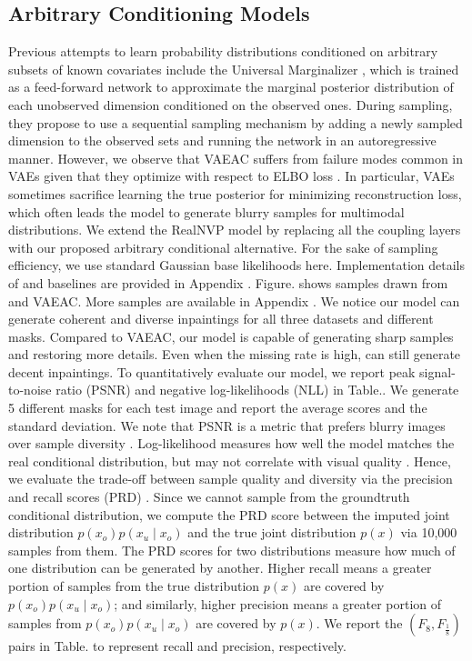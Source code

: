 \documentclass[letterpaper]{article} %
\begin{document}
\subsection{Arbitrary Conditioning Models}
Previous attempts to learn probability distributions conditioned on arbitrary subsets of known covariates include the Universal Marginalizer  , which is trained as a feed-forward network to approximate the marginal posterior distribution of each unobserved dimension conditioned on the observed ones. During sampling, they propose to use a sequential sampling mechanism by adding a newly sampled dimension to the observed sets and running the network in an autoregressive manner.
However, we observe that VAEAC suffers from failure modes common in VAEs given that they optimize with respect to ELBO loss . In particular, VAEs sometimes sacrifice learning the true posterior for minimizing reconstruction loss, which often leads the model to generate blurry samples for multimodal distributions.
We extend the RealNVP model  by replacing all the coupling layers with our proposed arbitrary conditional alternative. For the sake of sampling efficiency, we use standard Gaussian base likelihoods here. Implementation details of and baselines are provided in Appendix .
Figure. shows samples drawn from and VAEAC. More samples are available in Appendix . We notice our model can generate coherent and diverse inpaintings for all three datasets and different masks. Compared to VAEAC, our model is capable of generating sharp samples and restoring more details. Even when the missing rate is high, can still generate decent inpaintings.
To quantitatively evaluate our model, we report peak signal-to-noise ratio (PSNR) and negative log-likelihoods (NLL) in Table.. We generate 5 different masks for each test image and report the average scores and the standard deviation. We note that PSNR is a metric that prefers blurry images over sample diversity . Log-likelihood measures how well the model matches the real conditional distribution, but may not correlate with visual quality . Hence, we evaluate the trade-off between sample quality and diversity via the precision and recall scores (PRD) . Since we cannot sample from the groundtruth conditional distribution, we compute the PRD score between the imputed joint distribution $p(x_o)p(x_u \mid x_o)$ and the true joint distribution $p(x)$ via 10,000 samples from them. The PRD scores for two distributions measure how much of one distribution can be generated by another. Higher recall means
a greater portion of samples from the true distribution $p(x)$ are covered by $p(x_o)p(x_u \mid x_o)$;
and similarly, higher precision means a greater portion of samples from $p(x_o)p(x_u \mid x_o)$ are covered by $p(x)$. We report the $(F_8, F_{\frac{1}{8}})$ pairs in Table. to represent recall and precision, respectively.
\end{document}
